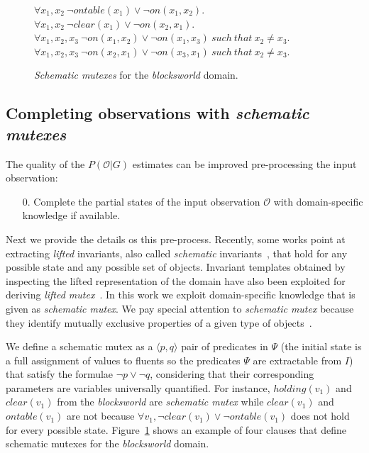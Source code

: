 \documentclass[letterpaper]{article} %
\newcommand{\tup}[1]{{\langle #1 \rangle}}
\begin{document}
\begin{figure}
  \begin{footnotesize}
$\forall x_1,x_2\ \neg ontable(x_1)\vee\neg on(x_1,x_2)$.\\
$\forall x_1,x_2\ \neg clear(x_1)\vee\neg on(x_2,x_1)$.\\
$\forall x_1,x_2,x_3\ \neg on(x_1,x_2)\vee\neg on(x_1,x_3)\ such\ that\ x_2\neq x_3$.\\
$\forall x_1,x_2,x_3\ \neg on(x_2,x_1)\vee\neg on(x_3,x_1)\ such\ that\ x_2\neq x_3$.\\
\end{footnotesize}
 \caption{\small {\em Schematic mutexes} for the {\em blocksworld} domain.}
\label{fig:strongest-invariant}
\end{figure}

\subsection{Completing observations with {\em schematic mutexes}}
The quality of the $P(\mathcal{O}|G)$ estimates can be improved pre-processing the input observation:
\begin{itemize}
\item[$0.$]  Complete the partial states of the input observation $\mathcal{O}$ with domain-specific knowledge if available.
\end{itemize}

Next we provide the details os this pre-process. Recently, some works point at extracting \emph{lifted} invariants, also called {\em schematic} invariants~\cite{rintanen:schematicInvariants:AAAI2017}, that hold for any possible state and any possible set of objects. Invariant templates obtained by inspecting the lifted representation of the domain have also been exploited for deriving \emph{lifted mutex}~\cite{BernardiniFS18}. In this work we exploit domain-specific knowledge that is given as {\em schematic mutex}. We pay special attention to {\em schematic mutex} because they identify mutually exclusive properties of a given type of objects~\cite{fox:TIM:JAIR1998}.

We define a schematic mutex as a $\tup{p,q}$ pair of predicates in $\Psi$ (the initial state is a full assignment of values to fluents so the predicates $\Psi$ are extractable from $I$) that satisfy the formulae $\neg p\vee \neg q$, considering that their corresponding parameters are variables universally quantified. For instance, $holding(v_1)$ and $clear(v_1)$ from the {\em blocksworld} are {\em schematic mutex} while $clear(v_1)$ and $ontable(v_1)$ are not because $\forall v_1, \neg clear(v_1)\vee\neg ontable(v_1)$ does not hold for every possible state. Figure~\ref{fig:strongest-invariant} shows an example of four clauses that define schematic mutexes for the {\em blocksworld} domain.
\end{document}
